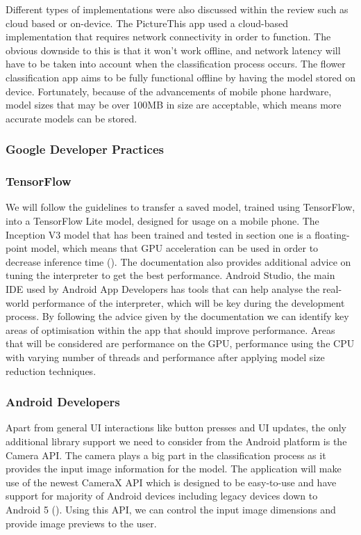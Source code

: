 \documentclass{article}
\begin{document}
Different types of implementations were also discussed within the review such as cloud based or on-device. 
The PictureThis app used a cloud-based implementation that requires network connectivity in order to function. 
The obvious downside to this is that it won't work offline, and network latency will have to be taken into account when 
the classification process occurs. The flower classification app aims to be fully functional offline by having the model
stored on device. Fortunately, because of the advancements of mobile phone hardware, model sizes that may be over 100MB 
in size are acceptable, which means more accurate models can be stored.

\subsubsection{Google Developer Practices}

\subsubsection*{TensorFlow}

We will follow the guidelines to transfer a saved model, trained using TensorFlow, into a TensorFlow Lite model, 
designed for usage on a mobile phone. The Inception V3 model that has been trained and tested in section one is a 
floating-point model, which means that GPU acceleration can be used in order to decrease inference time 
(\cite{TFGPU}). The documentation also provides additional advice on tuning the interpreter to get the best 
performance. Android Studio, the main IDE used by Android App Developers has tools that can help analyse the 
real-world performance of the interpreter, which will be key during the development process. By following the advice 
given by the documentation we can identify key areas of optimisation within the app that should improve performance. 
Areas that will be considered are performance on the GPU, performance using the CPU with varying number of threads and  
performance after applying model size reduction techniques.

\subsubsection*{Android Developers}

Apart from general UI interactions like button presses and UI updates, the only additional library support we need to 
consider from the Android platform is the Camera API. The camera plays a big part in the classification process as it 
provides the input image information for the model. The application will make use of the newest CameraX API which is 
designed to be easy-to-use and have support for majority of Android devices including legacy devices down to Android 5 
(\cite{ADCameraX}). Using this API, we can control the input image dimensions and provide image previews to the 
user.
\end{document}
